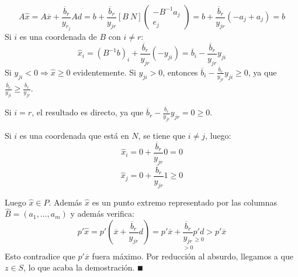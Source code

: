 \documentclass[PM.tex]{subfiles}
\begin{document}
\begin{dem}
\begin{itemize}
	\[ A\hat{x} = A\overline{x} + \frac{\overline{b}_r}{y_{r_j}} A d = b + \frac{\overline{b}_r}{y_{jr}} [B\ N] \begin{pmatrix}-B^{-1}a_j\\e_j\end{pmatrix} = b + \frac{\overline{b}_r}{y_{jr}}(-a_j + a_j) = b \]
	Si $i$ es una coordenada de $B$ con $i \neq r$:
	\[ \hat{x}_i = (B^{-1}b)_i + \frac{\overline{b}_r}{y_{jr}}(-y_{ji}) = \overline{b}_i - \frac{\overline{b}_r}{y_{jr}}y_{ji} \]
	Si $y_{ji} < 0 \Rightarrow \hat{x} ≥ 0$ evidentemente. Si $y_{ji} > 0$, entonces $\overline{b}_i - \frac{\overline{b}_r}{y_{jr}}y_{ji} ≥ 0$, ya que $ \frac{\overline{b}_r}{y_{ji}} ≥ \frac{\overline{b}_r}{y_{jr}}$.
	
	Si $i = r$, el resultado es directo, ya que $\overline{b}_r - \frac{\overline{b}_r}{y_{jr}}y_{jr} = 0 ≥ 0$.
	
	Si $i$ es una coordenada que está en $N$, se tiene que $i \neq j$, luego:
	\[ \hat{x}_i = 0 +  \frac{\overline{b}_r}{y_{jr}}0 = 0 \]
	\[ \hat{x}_j = 0 +  \frac{\overline{b}_r}{y_{jr}}1 ≥ 0 \]
	
	Luego $\hat{x} \in P$. Además $\hat{x}$ es un punto extremo representado por las columnas $\hat{B}= (a_1,\dots,a_m)$ y además verifica:
	\[ p'\hat{x} = p'(\overline{x} + \frac{\overline{b}_r}{y_{jr}}d) = p'\overline{x} + \underset{>0}{\frac{\overline{b}_r}{y_{jr}}} \underset{≥0}{p'd} > p'\overline{x} \]
	Esto contradice que $p'\overline{x}$ fuera máximo. Por reducción al absurdo, llegamos a que $z \in S$, lo que acaba la demostración.
	$\QED$
\end{itemize}
\end{dem}
\end{document}
